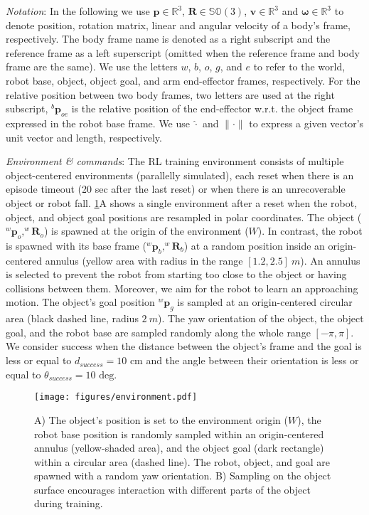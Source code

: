 \textit{Notation}: In the following we use $\pmb p \in \mathbb{R}^3$, $\pmb R \in \mathbb{SO}(3)$, $\pmb v \in \mathbb{R}^3$ and $\pmb \omega \in \mathbb{R}^3$ to denote position, rotation matrix, linear and angular velocity of a body's frame, respectively. The body frame name is denoted as a right subscript and the reference frame as a left superscript (omitted when the reference frame and body frame are the same). We use the letters $w$, $b$, $o$, $g$, and $e$ to refer to the world, robot base, object, object goal, and arm end-effector frames, respectively. For the relative position between two body frames, two letters are used at the right subscript, \eg $^b\pmb p_{oe}$ is the relative position of the end-effector w.r.t. the object frame expressed in the robot base frame. We use $\widehat{\cdot}$ and $\|\cdot\|$ to express a given vector's unit vector and length, respectively.

\textit{Environment \& commands}: The RL training environment consists of multiple object-centered environments (parallelly simulated), each reset when there is an episode timeout (20 sec after the last reset) or when there is an unrecoverable object or robot fall. \cref{Fig:environment}A shows a single environment after a reset when the robot, object, and object goal positions are resampled in polar coordinates. The object ($^w\pmb p_o, ^w\pmb R_o$) is spawned at the origin of the environment ($W$). In contrast, the robot is spawned with its base frame ($^w\pmb p_b, ^w\pmb R_b$) at a random position inside an origin-centered annulus (yellow area with radius in the range $[1.2, 2.5] \ m$). An annulus is selected to prevent the robot from starting too close to the object or having collisions between them. Moreover, we aim for the robot to learn an approaching motion. The object's goal position $^w \pmb p_g$ is sampled at an origin-centered circular area (black dashed line, radius $2 \ m$). The yaw orientation of the object, the object goal, and the robot base are sampled randomly along the whole range $[-\pi, \pi]$. We consider success when the distance between the object's frame and the goal is less or equal to $d_{success} = 10 \text{ cm}$ and the angle between their orientation is less or equal to $\theta_{success} = 10 \text{ deg}$.

\begin{figure}
  \centering
  \graphicspath{{figures/}}
  \texttt{[image: figures/environment.pdf]}
  \vspace{-8pt}
  \caption{A) The object's position is set to the environment origin ($W$), the robot base position is randomly sampled within an origin-centered annulus (yellow-shaded area), and the object goal (dark rectangle) within a circular area (dashed line). The robot, object, and goal are spawned with a random yaw orientation. B) Sampling on the object surface encourages interaction with different parts of the object during training.}
  \label{Fig:environment}
\end{figure}


